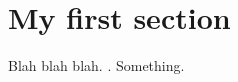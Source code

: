 \documentclass[fontsize=12pt,DIV=8,letterpaper,oneside]{scrartcl}
\begin{document}
\section{My first section}

Blah blah blah. \citet{CharnessDufwenberg2006}. Something.

\ifstandalone
\printbibliography
\fi
\end{document}
